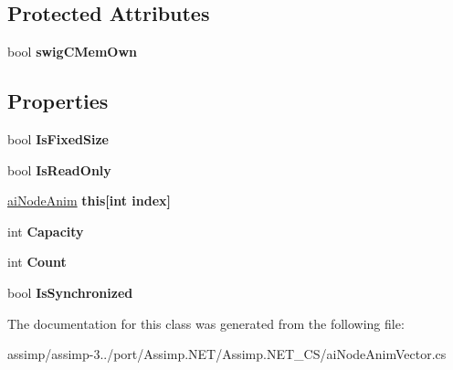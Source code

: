 \subsection*{Protected Attributes}
\begin{DoxyCompactItemize}
\item 
\hypertarget{classai_node_anim_vector_a9c28e6899f71412ef5a4812d80d8dc4a}{bool {\bfseries swig\+C\+Mem\+Own}}\label{classai_node_anim_vector_a9c28e6899f71412ef5a4812d80d8dc4a}

\end{DoxyCompactItemize}
\subsection*{Properties}
\begin{DoxyCompactItemize}
\item 
\hypertarget{classai_node_anim_vector_a3ea216498f96437fa5203be40757dd35}{bool {\bfseries Is\+Fixed\+Size}}\label{classai_node_anim_vector_a3ea216498f96437fa5203be40757dd35}

\item 
\hypertarget{classai_node_anim_vector_a8fa1aac1c6e06d4b236e349aed6e3a4b}{bool {\bfseries Is\+Read\+Only}}\label{classai_node_anim_vector_a8fa1aac1c6e06d4b236e349aed6e3a4b}

\item 
\hypertarget{classai_node_anim_vector_a28077f8f79f05e608cd39403d3a74b5e}{\hyperlink{structai_node_anim}{ai\+Node\+Anim} {\bfseries this\mbox{[}int index\mbox{]}}}\label{classai_node_anim_vector_a28077f8f79f05e608cd39403d3a74b5e}

\item 
\hypertarget{classai_node_anim_vector_a47fba4568b48fb042d94b6c45d9cee2f}{int {\bfseries Capacity}}\label{classai_node_anim_vector_a47fba4568b48fb042d94b6c45d9cee2f}

\item 
\hypertarget{classai_node_anim_vector_ad4ff4d605f32081f41a92954f343cb5d}{int {\bfseries Count}}\label{classai_node_anim_vector_ad4ff4d605f32081f41a92954f343cb5d}

\item 
\hypertarget{classai_node_anim_vector_a172d1d53c9eaf50af07a1ed97d56058c}{bool {\bfseries Is\+Synchronized}}\label{classai_node_anim_vector_a172d1d53c9eaf50af07a1ed97d56058c}

\end{DoxyCompactItemize}


The documentation for this class was generated from the following file\+:\begin{DoxyCompactItemize}
\item 
assimp/assimp-\/3../port/\+Assimp.\+N\+E\+T/\+Assimp.\+N\+E\+T\+\_\+\+C\+S/ai\+Node\+Anim\+Vector.\+cs\end{DoxyCompactItemize}
